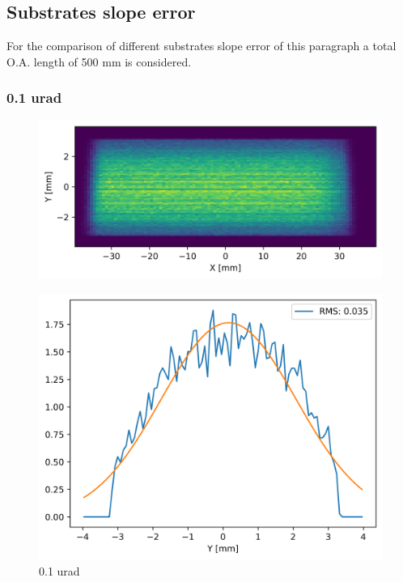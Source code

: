 \subsection{Substrates slope error}
For the comparison of different substrates slope error of this paragraph a total O.A. length of 500 mm is considered.

\clearpage
\subsubsection{0.1 urad}
\begin{figure}[H]
\centering
\includegraphics[width=0.9\linewidth]{./../figures/slope_error/WB4C_d30_d-spacing_gradient_45keV_slope_error01urad.png}
\end{figure}

\begin{figure}[H]
\centering
\includegraphics[width=0.9\linewidth]{./../figures/slope_error/WB4C_d30_d-spacing_gradient_45keV_slope_error01urad_Yprofile.png}
\caption{0.1 urad}
\label{fig:01urad}
\end{figure}

